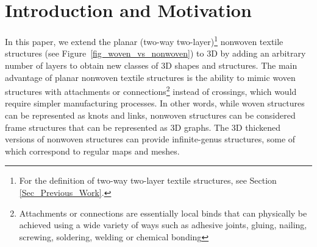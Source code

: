 \documentclass[times,twocolumn,final]{elsarticle}
\begin{document}


\section{Introduction and Motivation}

In this paper, we extend the planar (two-way two-layer)\footnote{For the definition of two-way two-layer textile structures, see Section \ref{Sec_Previous_Work}.} nonwoven textile structures (see Figure~\ref{fig_woven_vs_nonwoven}) to 3D by adding an arbitrary number of layers to obtain new classes of 3D shapes and structures. The main advantage of planar nonwoven textile structures is the ability to mimic woven structures with attachments or connections\footnote{Attachments or connections are essentially local binds that can physically be achieved using a wide variety of ways such as adhesive joints, gluing, nailing, screwing, soldering, welding or chemical bonding} instead of crossings, which would require simpler manufacturing processes. In other words, while woven structures can be represented as knots and links, nonwoven structures can be considered frame structures that can be represented as 3D graphs. The 3D thickened versions of nonwoven structures can provide infinite-genus structures, some of which correspond to regular maps and meshes. 
\end{document}

